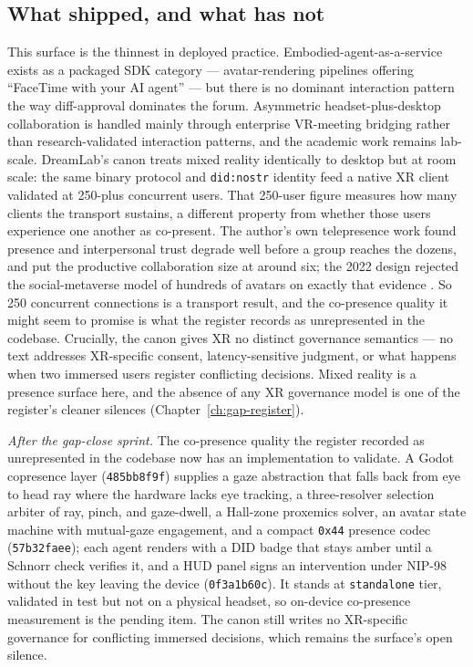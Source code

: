 \subsection{What shipped, and what has not}

This surface is the thinnest in deployed practice. Embodied-agent-as-a-service exists as a packaged SDK category --- avatar-rendering pipelines offering ``FaceTime with your AI agent'' \parencite{MatrixOne2026} --- but there is no dominant interaction pattern the way diff-approval dominates the forum. Asymmetric headset-plus-desktop collaboration is handled mainly through enterprise VR-meeting bridging rather than research-validated interaction patterns, and the academic work remains lab-scale. DreamLab's canon treats mixed reality identically to desktop but at room scale: the same binary protocol and \texttt{did:nostr} identity feed a native XR client validated at 250-plus concurrent users. That 250-user figure measures how many clients the transport sustains, a different property from whether those users experience one another as co-present. The author's own telepresence work found presence and interpersonal trust degrade well before a group reaches the dozens, and put the productive collaboration size at around six; the 2022 design rejected the social-metaverse model of hundreds of avatars on exactly that evidence \parencite{OHare2022Convergence}. So 250 concurrent connections is a transport result, and the co-presence quality it might seem to promise is what the register records as unrepresented in the codebase. Crucially, the canon gives XR no distinct governance semantics --- no text addresses XR-specific consent, latency-sensitive judgment, or what happens when two immersed users register conflicting decisions. Mixed reality is a presence surface here, and the absence of any XR governance model is one of the register's cleaner silences (Chapter~\ref{ch:gap-register}).

\emph{After the gap-close sprint.} The co-presence quality the register recorded as unrepresented in the codebase now has an implementation to validate. A Godot copresence layer (\texttt{485bb8f9f}) supplies a gaze abstraction that falls back from eye to head ray where the hardware lacks eye tracking, a three-resolver selection arbiter of ray, pinch, and gaze-dwell, a Hall-zone proxemics solver, an avatar state machine with mutual-gaze engagement, and a compact \texttt{0x44} presence codec (\texttt{57b32faee}); each agent renders with a DID badge that stays amber until a Schnorr check verifies it, and a HUD panel signs an intervention under NIP-98 without the key leaving the device (\texttt{0f3a1b60c}). It stands at \texttt{standalone} tier, validated in test but not on a physical headset, so on-device co-presence measurement is the pending item. The canon still writes no XR-specific governance for conflicting immersed decisions, which remains the surface's open silence.

